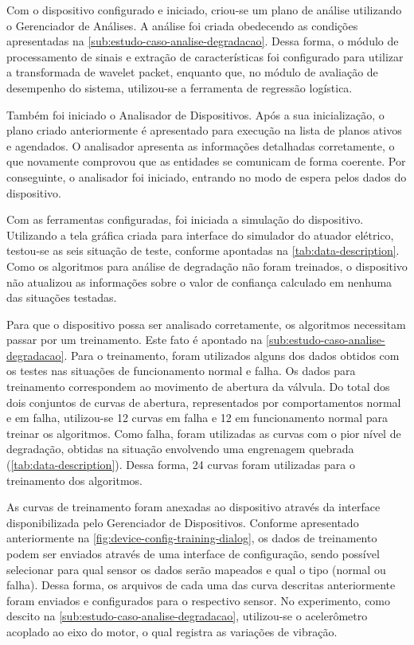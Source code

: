 Com o dispositivo configurado e iniciado, criou-se um plano de análise utilizando o Gerenciador de
Análises. A análise foi criada obedecendo as condições apresentadas na
\cref{sub:estudo-caso-analise-degradacao}. Dessa forma, o módulo de processamento de sinais e
extração de características foi configurado para utilizar a transformada de wavelet packet, enquanto
que, no módulo de avaliação de desempenho do sistema, utilizou-se a ferramenta de regressão
logística.

Também foi iniciado o Analisador de Dispositivos. Após a sua inicialização, o plano criado
anteriormente é apresentado para execução na lista de planos ativos e agendados. O analisador
apresenta as informações detalhadas corretamente, o que novamente comprovou que as entidades se
comunicam de forma coerente. Por conseguinte, o analisador foi iniciado, entrando no modo de espera
pelos dados do dispositivo.

Com as ferramentas configuradas, foi iniciada a simulação do dispositivo. Utilizando a tela gráfica
criada para interface do simulador do atuador elétrico, testou-se as seis situação de teste,
conforme apontadas na \cref{tab:data-description}. Como os algoritmos para análise de degradação não
foram treinados, o dispositivo não atualizou as informações sobre o valor de confiança calculado em
nenhuma das situações testadas.

Para que o dispositivo possa ser analisado corretamente, os algoritmos necessitam passar por um
treinamento. Este fato é apontado na \cref{sub:estudo-caso-analise-degradacao}. Para o treinamento,
foram utilizados alguns dos dados obtidos com os testes nas situações de funcionamento normal e
falha. Os dados para treinamento correspondem ao movimento de abertura da válvula. Do total dos dois
conjuntos de curvas de abertura, representados por comportamentos normal e em falha, utilizou-se
\num{12} curvas em falha e \num{12} em funcionamento normal para treinar os algoritmos. Como falha,
foram utilizadas as curvas com o pior nível de degradação, obtidas na situação envolvendo uma
engrenagem quebrada (\cref{tab:data-description}). Dessa forma, \num{24} curvas foram utilizadas
para o treinamento dos algoritmos.

As curvas de treinamento foram anexadas ao dispositivo através da interface disponibilizada pelo
Gerenciador de Dispositivos. Conforme apresentado anteriormente na
\cref{fig:device-config-training-dialog}, os dados de treinamento podem ser enviados através de uma
interface de configuração, sendo possível selecionar para qual sensor os dados serão mapeados e qual
o tipo (normal ou falha). Dessa forma, os arquivos de cada uma das curva descritas anteriormente
foram enviados e configurados para o respectivo sensor. No experimento, como descito na
\cref{sub:estudo-caso-analise-degradacao}, utilizou-se o acelerômetro acoplado ao eixo do motor, o
qual registra as variações de vibração.



